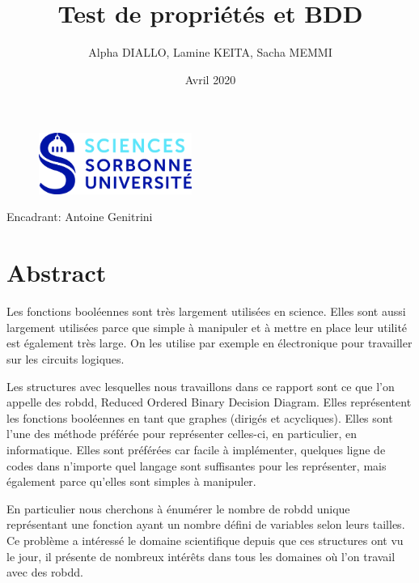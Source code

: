 \documentclass[french]{article}
\title{Test de propriétés et BDD}
\author{Alpha DIALLO, Lamine KEITA, Sacha MEMMI}
\date{Avril 2020}
\begin{document}
\maketitle
\begin{figure}[htp]
    \centering
    \includegraphics[width=5cm, height=2cm]{logo_upmc}
    \label{fig:logo}
\end{figure}

\begin{large}
\begin{center}
    Encadrant: Antoine Genitrini
\end{center}
\vfill
\begin{flushright}
\medskip

\medskip

\medskip

\end{flushright}
\end{large}


\newpage
\tableofcontents
\newpage
\section{Abstract}

Les fonctions booléennes sont très largement utilisées en science. Elles sont aussi largement utilisées parce que simple à manipuler et à mettre en place leur utilité est également très large. On les utilise par exemple en électronique pour travailler sur les circuits logiques.
\vspace{5mm} 

Les structures avec lesquelles nous travaillons dans ce rapport sont ce que l'on appelle des robdd, Reduced Ordered Binary Decision Diagram. Elles représentent les fonctions booléennes en tant que graphes (dirigés et acycliques). Elles sont l'une des méthode préférée pour représenter celles-ci, en particulier, en informatique. Elles sont préférées car facile à implémenter, quelques ligne de codes dans n'importe quel langage sont suffisantes pour les représenter, mais également parce qu'elles sont simples à manipuler.
\vspace{5mm} 

En particulier nous cherchons à énumérer le nombre de robdd unique représentant une fonction ayant un nombre défini de variables selon leurs tailles. Ce problème a intéressé le domaine scientifique depuis que ces structures ont vu le jour, il présente de nombreux intérêts dans tous les domaines où l'on travail avec des robdd.
\vspace{5mm} 
\end{document}
